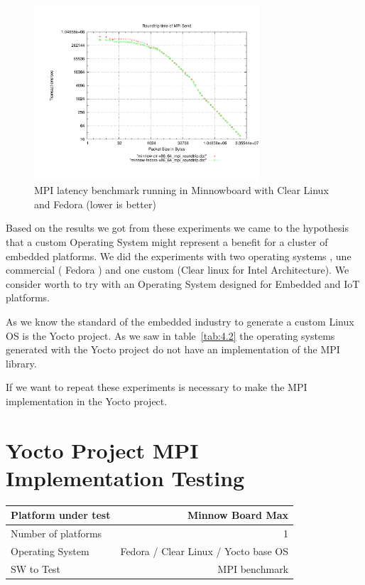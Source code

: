 \begin{figure}[H]
\centering
\includegraphics[width=0.75\textwidth]{images/mpbench_clr_experiments/mpi_roundtrip.pdf}
\caption{MPI latency benchmark running in Minnowboard with Clear Linux and
Fedora (lower is better)}
\label{mpi_roundtrip_clr_fedora}
\end{figure}

Based on the results we got from these experiments we came to the hypothesis
that a custom Operating System might represent a benefit for a cluster of
embedded platforms. We did the experiments with two operating systems , une
commercial ( Fedora ) and one custom (Clear linux for Intel Architecture). We
consider worth to try with an Operating System designed for Embedded and IoT
platforms. 

As we know the standard of the embedded industry to generate a custom Linux OS
is the Yocto project. As we saw in table~\ref{tab:4.2} the operating systems
generated with the Yocto project do not have an implementation of the MPI
library. 

If we want to repeat these experiments is necessary to make the MPI
implementation in the Yocto project. 


\section{Yocto Project MPI Implementation Testing}

    \begin{center}
    \begin{tabular}{ | l | r |}
        \hline
        Platform under test & Minnow Board  Max \\ \hline
        Number of platforms  & 1  \\ \hline
        Operating System & Fedora / Clear Linux / Yocto base OS  \\ \hline
        SW to Test & MPI benchmark \\ \hline
    \end{tabular}
    \end{center}

